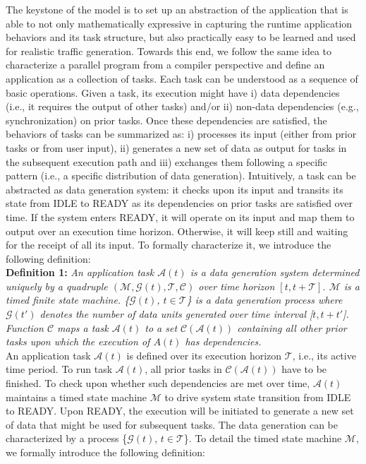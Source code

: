 The keystone of the model is to set up an abstraction of the application that is able to not only mathematically expressive in capturing the runtime application behaviors and its task structure, but also practically easy to be learned and used for realistic traffic generation. Towards this end, we follow the same idea to characterize a parallel program from a compiler perspective and define an application as a collection of tasks. Each task can be understood as a sequence of basic operations. Given a task, its execution might have i) data dependencies (i.e., it requires the output of other tasks) and/or ii) non-data dependencies (e.g., synchronization) on prior tasks. Once these dependencies are satisfied, the behaviors of tasks can be summarized as: i) processes its input (either from prior tasks or from user input), ii) generates a new set of data as output for tasks in the subsequent execution path and iii) exchanges them following a specific pattern (i.e., a specific distribution of data generation). Intuitively, a task can be abstracted as data generation system: it checks upon its input and transits its state from IDLE to READY as its dependencies on prior tasks are satisfied over time. If the system enters READY, it will operate on its input and map them to output over an execution time horizon. Otherwise, it will keep still and waiting for the receipt of all its input. To formally characterize it, we introduce the following definition:\\
\noindent \textbf{Definition 1:}\label{def:task} \textit{ An application task $\mathcal A(t)$ is a data generation system determined uniquely by a quadruple $(\mathcal M, \mathcal G(t), \mathcal T, \mathcal C)$  over time horizon $[t,t+\mathcal T]$. $\mathcal M$ is a timed finite state machine. \{$\mathcal G(t)$, $t\in \mathcal T$\} is a data generation process where $\mathcal G(t')$ denotes the number of data units generated over time interval [$t,t+t'$]. Function $\mathcal C$ maps a task $\mathcal A(t)$ to a set $\mathcal C(\mathcal A(t))$  containing all other prior tasks upon which the execution of $A(t)$ has dependencies. } \\
\indent An application task $\mathcal A(t)$ is defined over its execution horizon $\mathcal T$, i.e., its active time period. To run task $\mathcal A(t)$, all prior tasks in $\mathcal C(\mathcal A(t))$ have to be finished. To check upon whether such dependencies are met over time, $\mathcal A(t)$ maintains a timed state machine $\mathcal M$ to drive system state transition from IDLE to READY. Upon READY, the execution will be initiated to generate a new set of data that might be used for subsequent tasks. The data generation can be characterized by a process \{$\mathcal G(t)$, $t\in \mathcal T$\}. To detail the timed state machine $\mathcal M$, we formally introduce the following definition:\\
